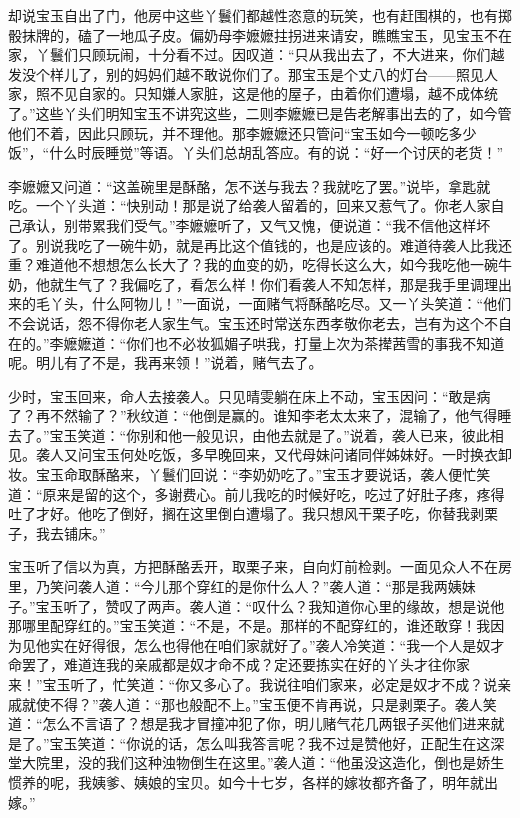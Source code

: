 \documentclass[12pt,oneside]{book}
\begin{document}
却说宝玉自出了门，他房中这些丫鬟们都越性恣意的玩笑，也有赶围棋的，也有掷骰抹牌的，磕了一地瓜子皮。偏奶母李嬷嬷拄拐进来请安，瞧瞧宝玉，见宝玉不在家，丫鬟们只顾玩闹，十分看不过。因叹道：“只从我出去了，不大进来，你们越发没个样儿了，别的妈妈们越不敢说你们了。那宝玉是个丈八的灯台——照见人家，照不见自家的。只知嫌人家脏，这是他的屋子，由着你们遭塌，越不成体统了。”这些丫头们明知宝玉不讲究这些，二则李嬷嬷已是告老解事出去的了，如今管他们不着，因此只顾玩，并不理他。那李嬷嬷还只管问“宝玉如今一顿吃多少饭”，“什么时辰睡觉”等语。丫头们总胡乱答应。有的说：“好一个讨厌的老货！”

李嬷嬷又问道：“这盖碗里是酥酪，怎不送与我去？我就吃了罢。”说毕，拿匙就吃。一个丫头道：“快别动！那是说了给袭人留着的，回来又惹气了。你老人家自己承认，别带累我们受气。”李嬷嬷听了，又气又愧，便说道：“我不信他这样坏了。别说我吃了一碗牛奶，就是再比这个值钱的，也是应该的。难道待袭人比我还重？难道他不想想怎么长大了？我的血变的奶，吃得长这么大，如今我吃他一碗牛奶，他就生气了？我偏吃了，看怎么样！你们看袭人不知怎样，那是我手里调理出来的毛丫头，什么阿物儿！”一面说，一面赌气将酥酪吃尽。又一丫头笑道：“他们不会说话，怨不得你老人家生气。宝玉还时常送东西孝敬你老去，岂有为这个不自在的。”李嬷嬷道：“你们也不必妆狐媚子哄我，打量上次为茶撵茜雪的事我不知道呢。明儿有了不是，我再来领！”说着，赌气去了。

少时，宝玉回来，命人去接袭人。只见晴雯躺在床上不动，宝玉因问：“敢是病了？再不然输了？”秋纹道：“他倒是赢的。谁知李老太太来了，混输了，他气得睡去了。”宝玉笑道：“你别和他一般见识，由他去就是了。”说着，袭人已来，彼此相见。袭人又问宝玉何处吃饭，多早晚回来，又代母妹问诸同伴姊妹好。一时换衣卸妆。宝玉命取酥酪来，丫鬟们回说：“李奶奶吃了。”宝玉才要说话，袭人便忙笑道：“原来是留的这个，多谢费心。前儿我吃的时候好吃，吃过了好肚子疼，疼得吐了才好。他吃了倒好，搁在这里倒白遭塌了。我只想风干栗子吃，你替我剥栗子，我去铺床。”

宝玉听了信以为真，方把酥酪丢开，取栗子来，自向灯前检剥。一面见众人不在房里，乃笑问袭人道：“今儿那个穿红的是你什么人？”袭人道：“那是我两姨妹子。”宝玉听了，赞叹了两声。袭人道：“叹什么？我知道你心里的缘故，想是说他那哪里配穿红的。”宝玉笑道：“不是，不是。那样的不配穿红的，谁还敢穿！我因为见他实在好得很，怎么也得他在咱们家就好了。”袭人冷笑道：“我一个人是奴才命罢了，难道连我的亲戚都是奴才命不成？定还要拣实在好的丫头才往你家来！”宝玉听了，忙笑道：“你又多心了。我说往咱们家来，必定是奴才不成？说亲戚就使不得？”袭人道：“那也般配不上。”宝玉便不肯再说，只是剥栗子。袭人笑道：“怎么不言语了？想是我才冒撞冲犯了你，明儿赌气花几两银子买他们进来就是了。”宝玉笑道：“你说的话，怎么叫我答言呢？我不过是赞他好，正配生在这深堂大院里，没的我们这种浊物倒生在这里。”袭人道：“他虽没这造化，倒也是娇生惯养的呢，我姨爹、姨娘的宝贝。如今十七岁，各样的嫁妆都齐备了，明年就出嫁。”
\end{document}
